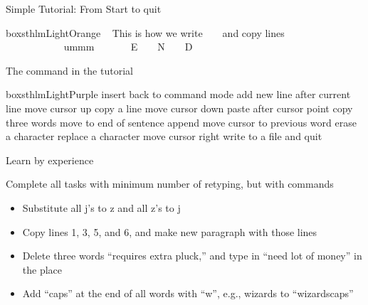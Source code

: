 \documentclass[newPxFont,sthlmFooter,nooffset]{beamer}
\begin{document}
\begin{frame}[containsverbatim,t]{Simple Tutorial: From Start to quit}
\begin{beamercolorbox}[sep=1em,wd=\linewidth]{boxsthlmLightOrange}
~ This is how we write ~ ~ and copy lines ~ ~ ~~ ~ ~
~ ~ ~ ~ ~ \keystroke{)}~ ~ ~ ~ ~ ~ ummm ~ ~ ~ ~
E ~ ~ N ~ ~ D \keystroke{:}~ ~ ~ ~
\end{beamercolorbox}

The command in the tutorial

\begin{beamercolorbox}[sep=1em,wd=\linewidth]{boxsthlmLightPurple}
 insert \hfill {} back to command mode \hfill {} add new line after current line \hfill {} move cursor up \hfill {} copy a line \hfill {} move cursor down \hfill {} paste after cursor point \hfill  {} copy three words \hfill \keystroke{)} move to end of sentence \hfill {} append \hfill {} move cursor to previous word \hfill {} erase a character \hfill {} replace a character \hfill {} move cursor right \hfill {} write to a file and quit
\end{beamercolorbox}

\end{frame}



\begin{frame}[containsverbatim,t]{Learn by experience}




Complete all tasks with minimum number of retyping, but with commands
\begin{itemize}
\item Substitute all j's to z and all z's to j
\item Copy lines 1, 3, 5, and 6, and make new paragraph with those lines
\item Delete three words ``requires extra pluck,'' and type in ``need lot of money'' in the place
\item Add ``caps'' at the end of all words with ``w'', e.g., wizards to ``wizardscaps''
\end{itemize}


\end{frame}
\end{document}
